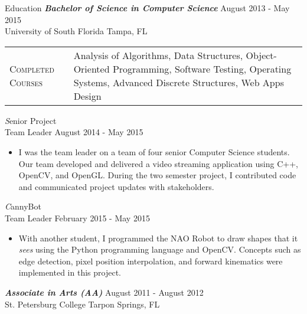 \begin{section}{Education}
  {\textsl \textbf{Bachelor of Science in Computer Science}} \hfill August 2013 - May 2015 \\
  University of South Florida \hfill Tampa, FL \\
  \begin{tabularx}{\linewidth}{@{}l X@{}}
    \textsc{Completed Courses} &\small{Analysis of Algorithms, Data Structures, Object-Oriented Programming, Software Testing, Operating Systems, Advanced Discrete Structures, Web Apps Design}\\
  \end{tabularx}
  {\textsl Senior Project} \\ Team Leader \hfill August 2014 - May 2015
  \begin{itemize}
    \item I was the team leader on a team of four senior Computer Science students. Our team developed and delivered a video streaming application using C++, OpenCV, and OpenGL. During the two semester project, I contributed code and communicated project updates with stakeholders.
  \end{itemize}
  {\textsl CannyBot} \\ Team Leader \hfill February 2015 - May 2015
  \begin{itemize}
    \item With another student, I programmed the NAO Robot to draw shapes that it \textit{sees} using the Python programming language and OpenCV. Concepts such as edge detection, pixel position interpolation, and forward kinematics were implemented in this project.
  \end{itemize}

  {\textsl \textbf{Associate in Arts (AA)}} \hfill August 2011 - August 2012 \\
  St. Petersburg College \hfill Tarpon Springs, FL \\
\end{section}
